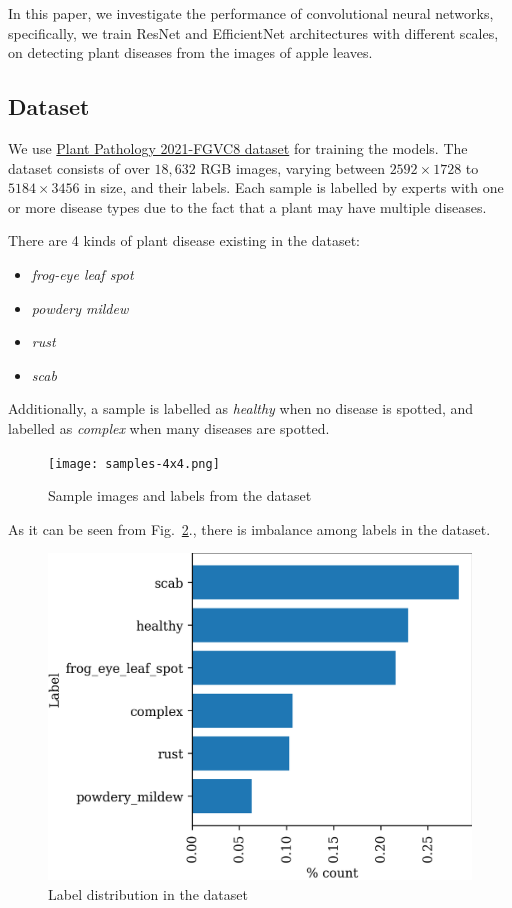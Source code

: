 \documentclass[conference]{IEEEtran}
\begin{document}
In this paper, we investigate the performance of convolutional neural networks, 
specifically, we train ResNet \cite{ResNet2016} 
and EfficientNet \cite{EfficientNet} architectures with different scales, 
on detecting plant diseases from the images of apple leaves. 

\subsection{Dataset}
We use \href{https://www.kaggle.com/c/plant-pathology-2021-fgvc8/overview}{Plant Pathology 2021-FGVC8 dataset} \cite{Thapa2020} for training the models. 
The dataset consists of over $18,632$ RGB images, 
varying between $2592 \times 1728$ to $5184 \times 3456$ in size, 
and their labels. Each sample is labelled by experts with one or more disease types 
due to the fact that a plant may have multiple diseases. 

There are 4 kinds of plant disease existing in the dataset:
\begin{itemize}
\item \textit{frog-eye leaf spot}
\item \textit{powdery mildew}
\item \textit{rust}
\item \textit{scab}
\end{itemize}

Additionally, a sample is labelled as \textit{healthy} when no disease is spotted, 
and labelled as \textit{complex} when many diseases are spotted.

\begin{figure}
    \centerline{\texttt{[image: samples-4x4.png]}}
    \caption{Sample images and labels from the dataset}
    \label{fig:samples}
\end{figure}

As it can be seen from Fig.~\ref{fig:label-dist}., there is imbalance among labels in the dataset.

\begin{figure}
    \centerline{\includegraphics[width = 0.45 \textwidth]{label-dist-ratio.png}}
    \caption{Label distribution in the dataset}
    \label{fig:label-dist}
\end{figure}
\end{document}

